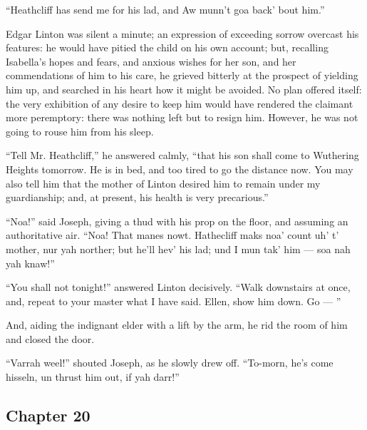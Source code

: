 \par “Heathcliff has send me for his lad, and Aw munn't goa back' bout him.”
\par Edgar Linton was silent a minute; an expression of exceeding sorrow overcast his features: he would have pitied the child on his own account; but, recalling Isabella's hopes and fears, and anxious wishes for her son, and her commendations of him to his care, he grieved bitterly at the prospect of yielding him up, and searched in his heart how it might be avoided. No plan offered itself: the very exhibition of any desire to keep him would have rendered the claimant more peremptory: there was nothing left but to resign him. However, he was not going to rouse him from his sleep.
\par “Tell Mr. Heathcliff,” he answered calmly, “that his son shall come to Wuthering Heights tomorrow. He is in bed, and too tired to go the distance now. You may also tell him that the mother of Linton desired him to remain under my guardianship; and, at present, his health is very precarious.”
\par “Noa!” said Joseph, giving a thud with his prop on the floor, and assuming an authoritative air. “Noa! That manes nowt. Hathecliff maks noa' count uh' t' mother, nur yah norther; but he'll hev' his lad; und I mun tak' him — soa nah yah knaw!”
\par “You shall not tonight!” answered Linton decisively. “Walk downstairs at once, and, repeat to your master what I have said. Ellen, show him down. Go — ”
\par And, aiding the indignant elder with a lift by the arm, he rid the room of him and closed the door.
\par “Varrah weel!” shouted Joseph, as he slowly drew off. “To-morn, he's come hisseln, un thrust him out, if yah darr!”


\subsection*{Chapter 20}


